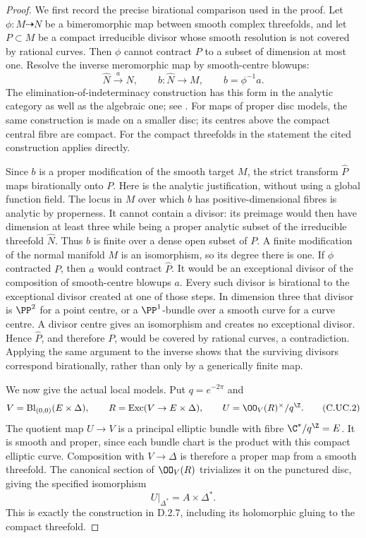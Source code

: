 \begin{proof}
We first record the precise birational comparison
used in the proof. Let $\phi:M\dashrightarrow N$
be a bimeromorphic map between smooth complex
threefolds, and let $P\subset M$ be a compact
irreducible divisor whose smooth resolution is
not covered by rational curves. Then $\phi$
cannot contract $P$ to a subset of dimension
at most one. Resolve the inverse meromorphic
map by smooth-centre blowups:
\[
 \widehat N\xrightarrow{\ a\ }N,
 \qquad b:\widehat N\longrightarrow M,
 \qquad b=\phi^{-1}a.
\tag{C.UC.1}
\]
The elimination-of-indeterminacy construction
has this form in the analytic category as
well as the algebraic one; see
\cite[Section~1.2.4 and Lemma~1.3.1]{AKMW2002}.
For maps of proper disc models, the same
construction is made on a smaller disc; its
centres above the compact central fibre are
compact. For the compact threefolds in the
statement the cited construction applies
directly.

Since $b$ is a proper modification of the
smooth target $M$, the strict transform
$\widehat P$ maps birationally onto $P$.
Here is the analytic justification, without
using a global function field. The locus in
$M$ over which $b$ has positive-dimensional
fibres is analytic by properness. It cannot
contain a divisor: its preimage would then
have dimension at least three while being
a proper analytic subset of the irreducible
threefold $\widehat N$. Thus $b$ is finite
over a dense open subset of $P$. A finite
modification of the normal manifold $M$
is an isomorphism, so its degree there is
one. If $\phi$ contracted
$P$, then $a$ would contract $\widehat P$.
It would be an exceptional divisor of the
composition of smooth-centre blowups $a$.
Every such divisor is birational to the
exceptional divisor created at one of those
steps. In dimension three that divisor is
$\PP^2$ for a point centre, or a
$\PP^1$-bundle over a smooth curve for a
curve centre. A divisor centre gives an
isomorphism and creates no exceptional
divisor. Hence $\widehat P$, and therefore
$P$, would be covered by rational curves,
a contradiction. Applying the same argument
to the inverse shows that the surviving
divisors correspond birationally, rather
than only by a generically finite map.

We now give the actual local models. Put
$q=e^{-2\pi}$ and
\[
 V=\operatorname{Bl}_{(0,0)}(E\times\Delta),
 \qquad R=\operatorname{Exc}(V\to E\times\Delta),
 \qquad U=\OO_V(R)^\times/q^{\Z}.
\tag{C.UC.2}
\]
The quotient map $U\to V$ is a principal
elliptic bundle with fibre $\C^*/q^{\Z}=E$.
It is smooth and proper, since each bundle
chart is the product with this compact
elliptic curve. Composition with $V\to\Delta$
is therefore a proper map from a smooth
threefold. The canonical section of
$\OO_V(R)$ trivializes it on the punctured
disc, giving the specified isomorphism
\[
                         U|_{\Delta^*}=A\times\Delta^*.
\tag{C.UC.3}
\]
This is exactly the construction in D.2.7,
including its holomorphic gluing to the
compact threefold.


\end{proof}
